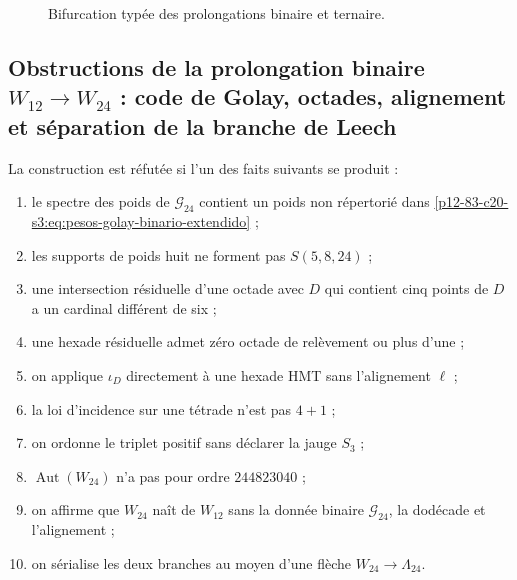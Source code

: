 \begin{figure}[htbp]
\centering
{}
\caption{Bifurcation typée des prolongations binaire et ternaire.}
\label{p12-83-c20-s3:fig:bifurcacion-w24-leech-autonoma}
\end{figure}

\subsection{Obstructions de la prolongation binaire \(W_{12}\to W_{24}\) : code de Golay, octades, alignement et séparation de la branche de Leech}

\begin{criterion}
La construction est réfutée si l'un des faits
suivants se produit :
\begin{enumerate}
 \item le spectre des poids de \(\mathcal G_{24}\) contient un poids non
       répertorié dans \eqref{p12-83-c20-s3:eq:pesos-golay-binario-extendido} ;
 \item les supports de poids huit ne forment pas \(S(5,8,24)\) ;
 \item une intersection résiduelle d'une octade avec \(D\) qui contient cinq
       points de \(D\) a un cardinal différent de six ;
 \item une hexade résiduelle admet zéro octade de relèvement ou plus d'une ;
 \item on applique \(\iota_D\) directement à une hexade HMT sans
       l'alignement \(\ell\) ;
 \item la loi d'incidence sur une tétrade n'est pas \(4+1\) ;
 \item on ordonne le triplet positif sans déclarer la jauge \(S_3\) ;
 \item \(\operatorname{Aut}(W_{24})\) n'a pas pour ordre \(244823040\) ;
 \item on affirme que \(W_{24}\) naît de \(W_{12}\) sans la donnée binaire
       \(\mathcal G_{24}\), la dodécade et l'alignement ;
 \item on sérialise les deux branches au moyen d'une flèche
       \(W_{24}\to\Lambda_{24}\).
\end{enumerate}
\end{criterion}


